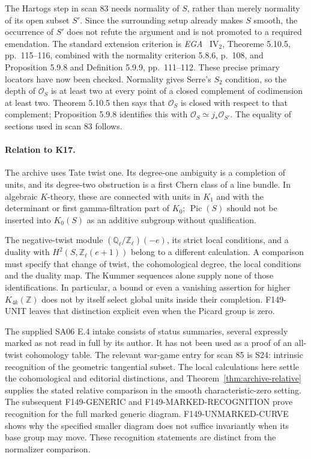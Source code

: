 \documentclass[11pt,a4paper]{article}
\theoremstyle{definition}
\begin{document}
The Hartogs step in scan 83 needs normality of \(S\), rather than
merely normality of its open subset \(S'\).  Since the surrounding
setup already makes \(S\) smooth, the occurrence of \(S'\) does not
refute the argument and is not promoted to a required emendation.
The standard extension criterion is \emph{EGA}~\cite{EGAIV2}
\(\mathrm{IV}_2\), Theoreme 5.10.5, pp.~115--116, combined with
the normality criterion 5.8.6, p.~108, and Proposition 5.9.8 and
Definition 5.9.9, pp.~111--112.  These precise primary locators have
now been checked.  Normality gives Serre's \(S_2\) condition, so
the depth of \(\mathcal O_S\) is at least two at every point of a
closed complement of codimension at least two.  Theorem 5.10.5
then says that \(\mathcal O_S\) is closed with respect to that
complement; Proposition 5.9.8 identifies this with
\(\mathcal O_S\simeq j_*\mathcal O_{S'}\).
The equality of sections used in scan 83 follows.

\paragraph{Relation to K17.}
The archive uses Tate twist one.  Its degree-one ambiguity is a
completion of units, and its degree-two obstruction is a first Chern
class of a line bundle.  In algebraic \(K\)-theory, these are connected
with units in \(K_1\) and with the determinant or first
gamma-filtration part of \(K_0\); \(\operatorname{Pic}(S)\) should
not be inserted into \(K_0(S)\) as an additive subgroup without
qualification.

The negative-twist module
\((\mathbb Q_\ell/\mathbb Z_\ell)(-e)\), its strict local conditions,
and a duality with \(H^2(S,\mathbb Z_\ell(e+1))\) belong to a
different calculation.  A comparison must specify that change of
twist, the cohomological degree, the local conditions and the duality
map.  The Kummer sequences alone supply none of those identifications.
In particular, a bound or even a vanishing assertion for higher
\(K_{4k}(\mathbb Z)\) does not by itself select global units inside
their completion.  F149-UNIT leaves that distinction explicit even
when the Picard group is zero.

The supplied SA06 E.4 intake consists of status summaries, several
expressly marked as not read in full by its author.  It has not been
used as a proof of an all-twist cohomology table.  The relevant
war-game entry for scan 85 is S24: intrinsic recognition of the
geometric tangential subset.  The local calculations here settle the
cohomological and editorial distinctions, and Theorem~\ref{thm:archive-relative} supplies the stated relative comparison in the smooth characteristic-zero setting. The subsequent F149-GENERIC and F149-MARKED-RECOGNITION prove recognition for the full marked generic diagram. F149-UNMARKED-CURVE shows why the specified smaller diagram does not suffice invariantly when its base group may move. These recognition statements are distinct from the normalizer comparison.
\end{document}
